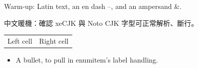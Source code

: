 \documentclass[11pt,a4paper]{article}
\begin{document}
Warm-up: Latin text, an en dash --, and an ampersand \&.

中文暖機：確認 xeCJK 與 Noto CJK 字型可正常解析、斷行。

\begin{tabularx}{\linewidth}{@{}Xr@{}}
  Left cell & Right cell
\end{tabularx}

\begin{itemize}[leftmargin=3.4mm,label={\footnotesize{}}]
  \item A bullet, to pull in enumitem's label handling.
\end{itemize}
\end{document}
